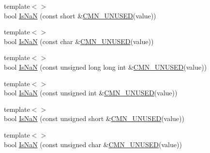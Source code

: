\begin{DoxyCompactItemize}
\item 
{\footnotesize template$<$$>$ }\\bool \hyperlink{classcmn_type_traits_a9b8bd8d268e509d56d4310361a8abfc9}{Is\-Na\-N} (const short \&\hyperlink{cmn_portability_8h_a021894e2626935fa2305434b1e893ff6}{C\-M\-N\-\_\-\-U\-N\-U\-S\-E\-D}(value))
\item 
{\footnotesize template$<$$>$ }\\bool \hyperlink{classcmn_type_traits_a9fd505fec8762050be529c958c62abfc}{Is\-Na\-N} (const char \&\hyperlink{cmn_portability_8h_a021894e2626935fa2305434b1e893ff6}{C\-M\-N\-\_\-\-U\-N\-U\-S\-E\-D}(value))
\item 
{\footnotesize template$<$$>$ }\\bool \hyperlink{classcmn_type_traits_a8f50cc32a683d36bf204b28d483d6daa}{Is\-Na\-N} (const unsigned long long int \&\hyperlink{cmn_portability_8h_a021894e2626935fa2305434b1e893ff6}{C\-M\-N\-\_\-\-U\-N\-U\-S\-E\-D}(value))
\item 
{\footnotesize template$<$$>$ }\\bool \hyperlink{classcmn_type_traits_a9d3d8e5e2cd2bcc7aec2da903951f270}{Is\-Na\-N} (const unsigned int \&\hyperlink{cmn_portability_8h_a021894e2626935fa2305434b1e893ff6}{C\-M\-N\-\_\-\-U\-N\-U\-S\-E\-D}(value))
\item 
{\footnotesize template$<$$>$ }\\bool \hyperlink{classcmn_type_traits_a78c8f5a476ef1f7d8552afd51fe96884}{Is\-Na\-N} (const unsigned short \&\hyperlink{cmn_portability_8h_a021894e2626935fa2305434b1e893ff6}{C\-M\-N\-\_\-\-U\-N\-U\-S\-E\-D}(value))
\item 
{\footnotesize template$<$$>$ }\\bool \hyperlink{classcmn_type_traits_abde8ab1f9a8f182fd1e0c0f7441c9e36}{Is\-Na\-N} (const unsigned char \&\hyperlink{cmn_portability_8h_a021894e2626935fa2305434b1e893ff6}{C\-M\-N\-\_\-\-U\-N\-U\-S\-E\-D}(value))
\end{DoxyCompactItemize}
